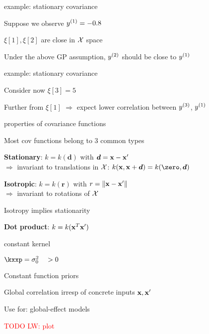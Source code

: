 \documentclass[11pt,compress,t,notes=noshow, xcolor=table]{beamer}
\begin{document}
\begin{framei}{example: stationary covariance}
\item Suppose we observe $\yi[1] = -0.8$
\item $\xi[1], \xi[2]$ are close in $\Xspace$ space
\item Under the above GP assumption, $\yi[2]$ should be close to $\yi[1]$ 
\vfill
{}
\end{framei}

\begin{framei}{example: stationary covariance}
\item Consider now $\xi[3] = 5$
\item Further from $\xi[1]$ $\Rightarrow$ expect lower correlation between $\yi[3]$, $\yi[1]$ 
\vfill
{}
\end{framei}

\begin{framei}[sep=L]{properties of covariance functions}
\item Most cov functions belong to 3 common types
\item \textbf{Stationary}: $k = k(\bm{d})$ with $\bm{d} = \xv - \xv^\prime$ \\
$\Rightarrow$ invariant to translations in $\Xspace$: $k(\xv, \xv + \bm{d}) = k(\zero, \bm{d})$
\item \textbf{Isotropic}: $k = k(\bm{r})$ with $r = \| \xv - \xv^\prime \|$ \\
$\Rightarrow$ invariant to rotations of $\Xspace$
\item Isotropy implies stationarity
\item \textbf{Dot product}: $k = k(\xv^T \xv^\prime)$
\end{framei}

\begin{framei}{constant kernel}
\item $\kxxp = \sigma^2_0 \quad > 0$
\item Constant function priors
\item Global correlation irresp of concrete inputs $\xv, \xv^\prime$
\item Use for: global-effect models
\item \textcolor{red}{TODO LW: plot}
\end{framei}
\end{document}
